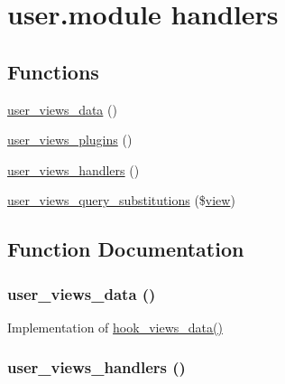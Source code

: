 \hypertarget{group__views__user__module}{
\section{user.module handlers}
\label{group__views__user__module}
}
\subsection*{Functions}
\begin{CompactItemize}
\item 
\hyperlink{group__views__user__module_g8de9e9f62db27dac6f5778d4362a7dc2}{user\_\-views\_\-data} ()
\item 
\hyperlink{group__views__user__module_ga36ee99043e81c01d59f8f7c47d310d1}{user\_\-views\_\-plugins} ()
\item 
\hyperlink{group__views__user__module_g51925c2452e1d30a13a4969e4a701c30}{user\_\-views\_\-handlers} ()
\item 
\hyperlink{group__views__user__module_ge3007fb2a7423125b3458d4018293eba}{user\_\-views\_\-query\_\-substitutions} (\$\hyperlink{classview}{view})
\end{CompactItemize}


\subsection{Function Documentation}
\hypertarget{group__views__user__module_g8de9e9f62db27dac6f5778d4362a7dc2}{
\subsubsection[{user\_\-views\_\-data}]{\setlength{\rightskip}{0pt plus 5cm}user\_\-views\_\-data ()}}
\label{group__views__user__module_g8de9e9f62db27dac6f5778d4362a7dc2}


Implementation of \hyperlink{group__views__hooks_g227057901681e4a33e33c199c7a8c989}{hook\_\-views\_\-data()} \hypertarget{group__views__user__module_g51925c2452e1d30a13a4969e4a701c30}{
\subsubsection[{user\_\-views\_\-handlers}]{\setlength{\rightskip}{0pt plus 5cm}user\_\-views\_\-handlers ()}}
\label{group__views__user__module_g51925c2452e1d30a13a4969e4a701c30}


